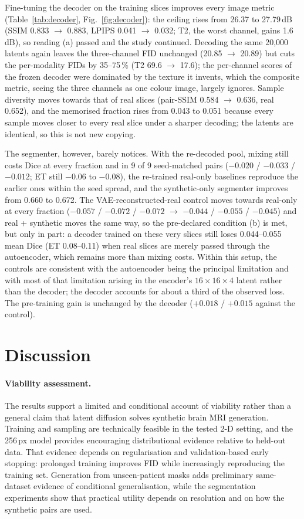 \documentclass[10pt,a4paper]{article}
\begin{document}
Fine-tuning the decoder on the training slices improves every image metric (Table~\ref{tab:decoder}, Fig.~\ref{fig:decoder}): the ceiling rises from 26.37 to 27.79\,dB (SSIM 0.833 $\to$ 0.883, LPIPS 0.041 $\to$ 0.032; T2, the worst channel, gains 1.6\,dB), so reading (a) passed and the study continued. Decoding the same 20,000 latents again leaves the three-channel FID unchanged (20.85 $\to$ 20.89) but cuts the per-modality FIDs by 35--75\,\% (T2 69.6 $\to$ 17.6); the per-channel scores of the frozen decoder were dominated by the texture it invents, which the composite metric, seeing the three channels as one colour image, largely ignores. Sample diversity moves towards that of real slices (pair-SSIM 0.584 $\to$ 0.636, real 0.652), and the memorised fraction rises from 0.043 to 0.051 because every sample moves closer to every real slice under a sharper decoding; the latents are identical, so this is not new copying.

The segmenter, however, barely notices. With the re-decoded pool, mixing still costs Dice at every fraction and in 9 of 9 seed-matched pairs ($-0.020$ / $-0.033$ / $-0.012$; ET still $-0.06$ to $-0.08$), the re-trained real-only baselines reproduce the earlier ones within the seed spread, and the synthetic-only segmenter improves from 0.660 to 0.672. The VAE-reconstructed-real control moves towards real-only at every fraction ($-0.057$ / $-0.072$ / $-0.072$ $\to$ $-0.044$ / $-0.055$ / $-0.045$) and real + synthetic moves the same way, so the pre-declared condition (b) is met, but only in part: a decoder trained on these very slices still loses 0.044--0.055 mean Dice (ET 0.08--0.11) when real slices are merely passed through the autoencoder, which remains more than mixing costs. Within this setup, the controls are consistent with the autoencoder being the principal limitation and with most of that limitation arising in the encoder's $16\times16\times4$ latent rather than the decoder; the decoder accounts for about a third of the observed loss. The pre-training gain is unchanged by the decoder ($+0.018$ / $+0.015$ against the control).

\FloatBarrier
\section{Discussion}
\paragraph{Viability assessment.} The results support a limited and conditional account of viability rather than a general claim that latent diffusion solves synthetic brain MRI generation. Training and sampling are technically feasible in the tested 2-D setting, and the 256\,px model provides encouraging distributional evidence relative to held-out data. That evidence depends on regularisation and validation-based early stopping: prolonged training improves FID while increasingly reproducing the training set. Generation from unseen-patient masks adds preliminary same-dataset evidence of conditional generalisation, while the segmentation experiments show that practical utility depends on resolution and on how the synthetic pairs are used.
\end{document}
